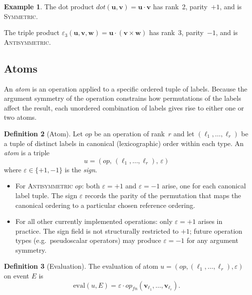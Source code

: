 \documentclass[11pt,a4paper]{article}
\theoremstyle{definition}
\newtheorem{definition}{Definition}[section]
\newtheorem{example}[definition]{Example}
\theoremstyle{plain}
\theoremstyle{remark}
\newcommand{\eval}{\mathrm{eval}}
\begin{document}
\begin{example}
The dot product $\mathit{dot}(\mathbf{u},\mathbf{v}) = \mathbf{u}\cdot\mathbf{v}$ has
rank~2, parity~$+1$, and is \textsc{Symmetric}.

The triple product
$\varepsilon_3(\mathbf{u},\mathbf{v},\mathbf{w}) =
\mathbf{u}\cdot(\mathbf{v}\times\mathbf{w})$ has rank~3, parity~$-1$, and is
\textsc{Antisymmetric}.
\end{example}

\subsection{Atoms}

An \emph{atom} is an operation applied to a specific ordered tuple of labels.
Because the argument symmetry of the operation constrains how permutations of
the labels affect the result, each unordered combination of labels gives rise to
either one or two atoms.

\begin{definition}[Atom]
Let $\mathit{op}$ be an operation of rank~$r$ and let
$(\ell_1,\ldots,\ell_r)$ be a tuple of distinct labels in canonical
(lexicographic) order within each type.  An \emph{atom} is a triple
\[
  u = (\mathit{op},\, (\ell_1,\ldots,\ell_r),\, \varepsilon)
\]
where $\varepsilon \in \{+1,-1\}$ is the \emph{sign}.

\begin{itemize}
  \item For \textsc{Antisymmetric} $\mathit{op}$: both $\varepsilon = +1$ and
    $\varepsilon = -1$ arise, one for each canonical label tuple.  The sign
    $\varepsilon$ records the parity of the permutation that maps the canonical
    ordering to a particular chosen reference ordering.
  \item For all other currently implemented operations: only $\varepsilon = +1$
    arises in practice.  The sign field is not structurally restricted to
    $+1$; future operation types (e.g.\ pseudoscalar operators) may produce
    $\varepsilon = -1$ for any argument symmetry.
\end{itemize}
\end{definition}

\begin{definition}[Evaluation]
The evaluation of atom $u = (\mathit{op}, (\ell_1,\ldots,\ell_r), \varepsilon)$
on event $E$ is
\[
  \eval(u, E) = \varepsilon \cdot \mathit{op}_{fn}(\mathbf{v}_{\ell_1},
  \ldots, \mathbf{v}_{\ell_r}).
\]
\end{definition}
\end{document}
